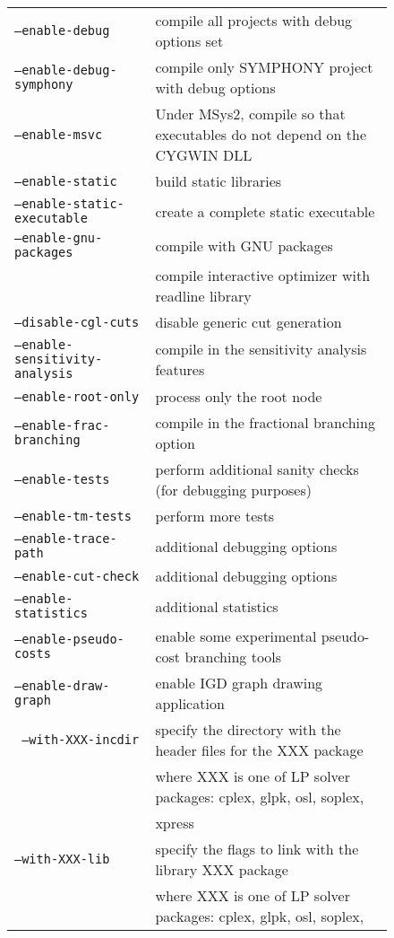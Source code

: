 \begin{figure}[htb]
\begin{tabular}{ll}
\hline
\texttt{--enable-debug} & compile all projects with debug options set \\
\texttt{--enable-debug-symphony} & compile only SYMPHONY project with debug options \\
\texttt{--enable-msvc} & Under MSys2, compile so that executables do
not depend on the CYGWIN DLL \\
\texttt{--enable-static} & build static libraries \\
\texttt{--enable-static-executable} &  create a complete static executable \\
\texttt{--enable-gnu-packages} & compile with GNU packages \\ 
& compile interactive optimizer with readline library \\
\hline
\texttt{--disable-cgl-cuts} & disable generic cut generation \\
\texttt{--enable-sensitivity-analysis} & compile in the sensitivity analysis features \\
\texttt{--enable-root-only} & process only the root node \\
\texttt{--enable-frac-branching} & compile in the fractional branching option \\
\texttt{--enable-tests}&  perform additional sanity checks (for debugging purposes) \\
\texttt{--enable-tm-tests }& perform more tests  \\
\texttt{--enable-trace-path}&  additional debugging options \\
\texttt{--enable-cut-check}& additional debugging options \\
\texttt{--enable-statistics}& additional statistics \\
\texttt{--enable-pseudo-costs}& enable some experimental pseudo-cost branching tools \\
\texttt{--enable-draw-graph} &  enable IGD graph drawing application \\
\hline
\texttt{ --with-XXX-incdir} &  specify the directory with the header files for the XXX package \\ 
&where XXX is one of LP solver packages: cplex, glpk, osl, soplex, \\ 
& xpress \\
\texttt{--with-XXX-lib} &  specify the flags to link with the library  
XXX package \\ 
&where XXX is one of LP solver packages: cplex, glpk, osl, soplex, \\ 

\end{tabular}
\end{figure}
